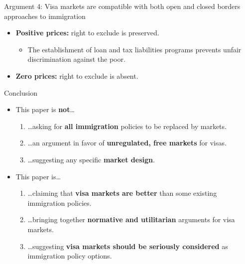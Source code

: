 \documentclass[10pt,ignorenonframetext,]{beamer}
\providecommand{\tightlist}{%
  \setlength{\itemsep}{0pt}\setlength{\parskip}{0pt}}
\begin{document}
\begin{frame}{Argument 4: Visa markets are compatible with both open and
closed borders approaches to immigration}
\protect\hypertarget{arg4}{}

\begin{itemize}
\tightlist
\item
  \textbf{Positive prices:} right to exclude is preserved.\\
  \bigskip

  \begin{itemize}
  \tightlist
  \item
    The establishment of loan and tax liabilities programs prevents
    unfair discrimination against the poor.\\
    \bigskip
  \end{itemize}
\item
  \textbf{Zero prices:} right to exclude is absent.
\end{itemize}

\end{frame}

\begin{frame}{Conclusion}
\protect\hypertarget{conclusion}{}

\begin{itemize}
\tightlist
\item
  This paper is \textbf{not}\ldots{}\\
  \bigskip

  \begin{enumerate}
  \tightlist
  \item
    \ldots{}asking for \textbf{all immigration} policies to be replaced
    by markets.\\
    \medskip
  \item
    \ldots{}an argument in favor of \textbf{unregulated, free markets}
    for visas.\\
    \medskip
  \item
    \ldots{}suggesting any specific \textbf{market design}.\\
    \bigskip
  \end{enumerate}
\item
  This paper is\ldots{}\\
  \bigskip

  \begin{enumerate}
  \tightlist
  \item
    \ldots{}claiming that \textbf{visa markets are better} than some
    existing immigration policies.\\
    \medskip
  \item
    \ldots{}bringing together \textbf{normative and utilitarian}
    arguments for visa markets.\\
    \medskip
  \item
    \ldots{}suggesting \textbf{visa markets should be seriously
    considered} as immigration policy options.
  \end{enumerate}
\end{itemize}

\end{frame}
\end{document}
